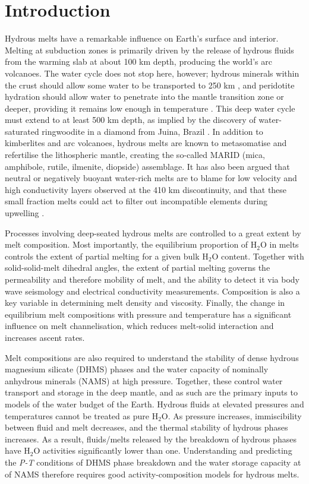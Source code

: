 \documentclass[review]{elsarticle}
\begin{document}
\linenumbers

\section{Introduction}
Hydrous melts have a remarkable influence on Earth's surface and interior. Melting at subduction zones is primarily driven by the release of hydrous fluids from the warming slab at about 100 km depth, producing the world's arc volcanoes. The water cycle does not stop here, however; hydrous minerals within the crust should allow some water to be transported to 250 km \citep{PS2002}, and peridotite hydration should allow water to penetrate into the mantle transition zone or deeper, providing it remains low enough in temperature \citep{KOM2005}. This deep water cycle must extend to at least 500 km depth, as implied by the discovery of water-saturated ringwoodite in a diamond from Juina, Brazil \citep{Pearsonetal2014}. In addition to kimberlites and arc volcanoes, hydrous melts are known to metasomatise and refertilise the lithospheric mantle, creating the so-called MARID (mica, amphibole, rutile, ilmenite, diopside) assemblage. It has also been argued that neutral or negatively buoyant water-rich melts are to blame for low velocity and high conductivity layers observed at the 410 km discontinuity, and that these small fraction melts could act to filter out incompatible elements during upwelling \citep{BK2003}. 

Processes involving deep-seated hydrous melts are controlled to a great extent by melt composition. Most importantly, the equilibrium proportion of H$_2$O in melts controls the extent of partial melting for a given bulk H$_2$O content. Together with solid-solid-melt dihedral angles, the extent of partial melting governs the permeability and therefore mobility of melt, and the ability to detect it via body wave seismology and electrical conductivity measurements.  Composition is also a key variable in determining melt density and viscosity. Finally, the change in equilibrium melt compositions with pressure and temperature has a significant influence on melt channelisation, which reduces melt-solid interaction and increases ascent rates. 

Melt compositions are also required to understand the stability of dense hydrous magnesium silicate (DHMS) phases and the water capacity of nominally anhydrous minerals (NAMS) at high pressure. Together, these control water transport and storage in the deep mantle, and as such are the primary inputs to models of the water budget of the Earth. Hydrous fluids at elevated pressures and temperatures cannot be treated as pure H$_2$O. As pressure increases, immiscibility between fluid and melt decreases, and the thermal stability of hydrous phases increases. As a result, fluids/melts released by the breakdown of hydrous phases have H$_2$O activities significantly lower than one. Understanding and predicting the \emph{P-T} conditions of DHMS phase breakdown and the water storage capacity at of NAMS therefore requires good activity-composition models for hydrous melts.
\end{document}
